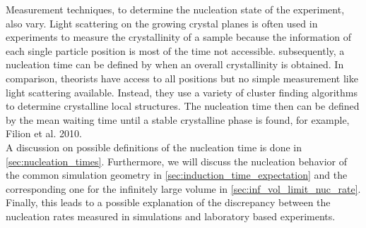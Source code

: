 Measurement techniques, to determine the nucleation state of the experiment, also vary. Light scattering on the growing crystal planes is often used in experiments to measure the crystallinity of a sample because the information of each single particle position is most of the time not accessible. subsequently, a nucleation time can be defined by when an overall crystallinity is obtained. In comparison, theorists have access to all positions but no simple measurement like light scattering available. Instead, they use a variety of cluster finding algorithms to determine crystalline local structures. The nucleation time then can be defined by the mean waiting time until a stable crystalline phase is found, for example, Filion et al. 2010\cite{Filion2010a}.\\ 

A discussion on possible definitions of the nucleation time is done in \autoref{sec:nucleation_times}. Furthermore, we will discuss the nucleation behavior of the common simulation geometry in \autoref{sec:induction_time_expectation} and the corresponding one for the infinitely large volume in \autoref{sec:inf_vol_limit_nuc_rate}. Finally, this leads to a possible explanation of the discrepancy between the nucleation rates measured in simulations and laboratory based experiments.

\FloatBarrier
